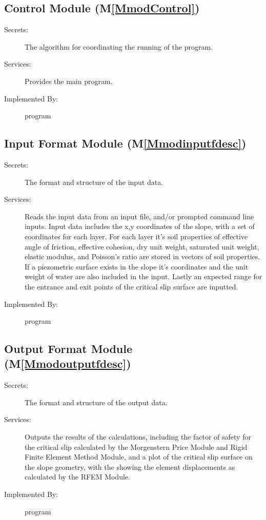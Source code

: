\documentclass[12pt]{article}
\begin{document}
\subsection{Control Module (M\ref{MmodControl})}
\label{Sec:CM()}
\begin{description}
\item[Secrets:]The algorithm for coordinating the running of the program.
\item[Services:]Provides the main program.
\item[Implemented By:]program
\end{description}
\subsection{Input Format Module (M\ref{Mmodinputfdesc})}
\label{Sec:IFM()}
\begin{description}
\item[Secrets:]The format and structure of the input data.
\item[Services:]Reads the input data from an input file, and/or prompted command line inputs. Input data includes the x,y coordinates of the slope, with a set of coordinates for each layer. For each layer it's soil properties of effective angle of friction, effective cohesion, dry unit weight, saturated unit weight, elastic modulus, and Poisson's ratio are stored in vectors of soil properties. If a piezometric surface exists in the slope it's coordinates and the unit weight of water are also included in the input. Lastly an expected range for the entrance and exit points of the critical slip surface are inputted.
\item[Implemented By:]program
\end{description}
\subsection{Output Format Module (M\ref{Mmodoutputfdesc})}
\label{Sec:OFM()}
\begin{description}
\item[Secrets:]The format and structure of the output data.
\item[Services:]Outputs the results of the calculations, including the factor of safety for the critical slip calculated by the Morgenstern Price Module and Rigid Finite Element Method Module, and a plot of the critical slip surface on the slope geometry, with the showing the element displacements as calculated by the RFEM Module.
\item[Implemented By:]program
\end{description}
\end{document}
